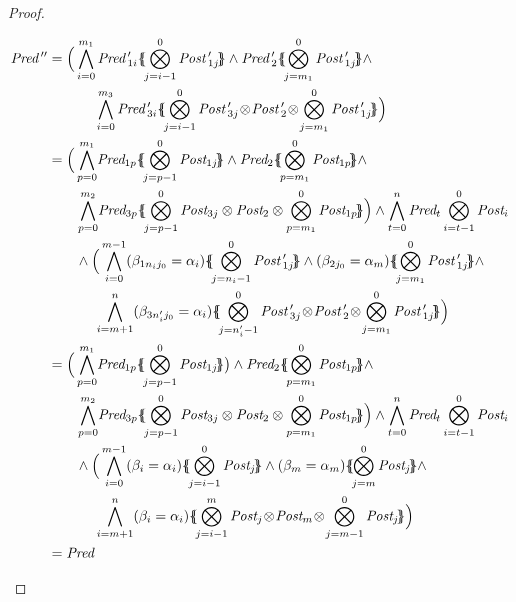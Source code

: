 \documentclass{lmcs}
\newcommand{\shortotimes}{\!\otimes\!}
\begin{document}
\begin{proof}
\begin{footnotesize}
\begin{equation*}
\begin{split}
\Pred\,''&=\Big(\bigwedge_{i=0}^{m_1}\Pred\,'_{1i}\subst{\bigotimes_{j=i-1}^{0}\Post\,'_{1j}}\land\Pred\,'_2 \subst{\bigotimes_{j=m_1}^{0}\Post\,'_{1j}}\land\\ &\qquad
~\quad\bigwedge_{i=0}^{m_3}\Pred\,'_{3i}\subst{\bigotimes_{j=i-1}^{0}\Post\,'_{3j}\shortotimes\Post\,'_2\shortotimes\bigotimes_{j=m_1}^{0}\Post\,'_{1j}}\Big)\\
&=\Big(\bigwedge_{p=0}^{m_1}\!\Pred_{1p}\subst{\bigotimes_{j=p-1}^{0}\Post_{1j}}\land\Pred_2\subst{\bigotimes_{p=m_1}^{0}\Post_{1p}}\land\\
&\qquad \bigwedge_{p=0}^{m_2}\!\Pred_{3p}\subst{\bigotimes_{j=p-1}^{0}\Post_{3j}\otimes\Post_2 \otimes\bigotimes_{p=m_1}^{0}\Post_{1p}}\Big)%
\land \bigwedge_{t=0}^{n} \Pred_t\bigotimes_{i=t-1}^{0}\Post_i\\&\qquad
\land \Big( \bigwedge_{i=0}^{m-1}(\beta_{1{n_i}{j_0}}=\alpha_i)\subst{\bigotimes_{j={n_i}-1}^{0}\Post\,'_{1j}}\land(\beta_{2{j_0}}=\alpha_m) \subst{\bigotimes_{j=m_1}^{0}\Post\,'_{1j}}\land\\ &\qquad
~\quad\bigwedge_{i=m+1}^{n}(\beta_{3{n'_i}{j_0}}=\alpha_i)\subst{\bigotimes_{j=n'_i-1}^{0}\Post\,'_{3j}\shortotimes\Post\,'_2\shortotimes\bigotimes_{j=m_1}^{0}\Post\,'_{1j}}\Big)\\
&=\Big(\bigwedge_{p=0}^{m_1}\!\Pred_{1p}\subst{\bigotimes_{j=p-1}^{0}\Post_{1j}}\big)\land\Pred_2\subst{\bigotimes_{p=m_1}^{0}\Post_{1p}}\land\\&\qquad \bigwedge_{p=0}^{m_2}\!\Pred_{3p}\subst{\bigotimes_{j=p-1}^{0}\Post_{3j}\otimes\Post_2 \otimes\bigotimes_{p=m_1}^{0}\Post_{1p}}\Big)%
\land \bigwedge_{t=0}^{n} \Pred_t\bigotimes_{i=t-1}^{0}\Post_i\\&\qquad
\land \Big(\bigwedge_{i=0}^{m-1}(\beta_{i}=\alpha_i)\subst{\bigotimes_{j={i-1}}^{0}\Post_{j}}\land(\beta_m=\alpha_m )\subst{\bigotimes_{j=m}^{0}\Post_{j}}\land\\ &\qquad
~\quad\bigwedge_{i=m+1}^{n}(\beta_i=\alpha_i)\subst{\bigotimes_{j=i-1}^{m}\Post_j\shortotimes\Post_m\shortotimes\bigotimes_{j=m-1}^{0}\Post_{j}}\Big)\\
&=\Pred
\end{split}
\end{equation*}
\end{footnotesize}



\end{proof}
\end{document}
